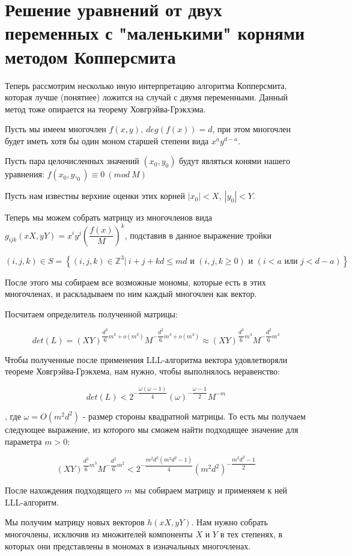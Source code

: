 \documentclass[12pt,a4paper]{scrartcl}
\begin{document}
	
\section{Решение уравнений от двух переменных с "маленькими" корнями методом Копперсмита}

Теперь рассмотрим несколько иную интерпретацию алгоритма Копперсмита, которая лучше (понятнее) ложится на случай с двумя переменными. Данный метод тоже опирается на теорему Ховгрэйва-Грэкхэма.

Пусть мы имеем многочлен $f(x,y),\ deg(f(x))=d$, при этом многочлен будет иметь хотя бы один моном старшей степени вида $x^ay^{d-a}$.

Пусть пара целочисленных значений $(x_0, y_0)$ будут являться конями нашего уравнения: $f(x_0,y,_0)\equiv 0\ (mod\ M)$

Пусть нам известны верхние оценки этих корней $|x_0|<X,\ |y_0|<Y$.

Теперь мы можем собрать матрицу из многочленов вида $g_{ijk}(xX,yY)=x^iy^j\left(\dfrac{f(x)}{M}\right)^k$, подставив в данное выражение тройки 

$$(i,j,k) \in S = \left\{ (i,j,k) \in \mathbb{Z}^3 |\ i+j+kd \leq md\text{ и }(i,j,k \geq 0)\text{ и }(i<a\text{ или }j<d-a)\right\}$$

После этого мы собираем все возможные мономы, которые есть в этих многочленах, и раскладываем по ним каждый многочлен как вектор.

Посчитаем определитель полученной матрицы:

$$det(L)=(XY)^{\dfrac{d^3}{6}m^3+o(m^3)}M^{-\dfrac{d^2}{6}m^3+o(m^3)} \approx (XY)^{\dfrac{d^3}{6}m^3}M^{-\dfrac{d^2}{6}m^3}$$

Чтобы полученные после применения LLL-алгоритма вектора удовлетворяли теореме Ховгрэйва-Грэкхема, нам нужно, чтобы выполнялось неравенство:

$$det(L)<2^{-\dfrac{\omega(\omega-1)}{4}}(\omega)^{-\dfrac{\omega-1}{2}}M^{-m}$$

, где $\omega=O(m^2d^2)$ - размер стороны квадратной матрицы. То есть мы получаем следующее выражение, из которого мы сможем найти  подходящее значение для параметра $m>0$:

$$(XY)^{\dfrac{d^3}{6}m^3}M^{-\dfrac{d^2}{6}m^2} < 2^{-\dfrac{m^2d^2(m^2d^2-1)}{4}}(m^2d^2)^{-\dfrac{m^2d^2-1}{2}}$$

После нахождения подходящего $m$ мы собираем матрицу и применяем к ней LLL-алгоритм. 

Мы получим матрицу новых векторов $h(xX,yY)$. Нам нужно собрать многочлены, исключив из множителей компоненты $X$ и $Y$ в тех степенях, в которых они представлены в мономах в изначальных многочленах.
\end{document}
